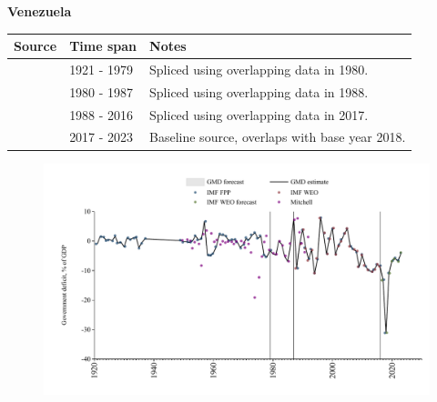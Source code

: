 \documentclass[12pt,a4paper,landscape]{article}
\begin{document}
\begin{adjustbox}{max totalsize={\paperwidth}{\paperheight},center}
\begin{minipage}[t][\textheight][t]{\textwidth}
\vspace*{0.5cm}
{}
\begin{center}
{\Large\bfseries Venezuela}
\end{center}
\vspace{0.5cm}
\begin{table}[H]
\centering
\small
\begin{tabular}{|l|l|l|}
\hline
\textbf{Source} & \textbf{Time span} & \textbf{Notes} \\
\hline
\rowcolor{white}\cite{IMF_FPP}& 1921 - 1979 &Spliced using overlapping data in 1980.\\
\rowcolor{lightgray}\cite{Mitchell}& 1980 - 1987 &Spliced using overlapping data in 1988.\\
\rowcolor{white}\cite{IMF_WEO}& 1988 - 2016 &Spliced using overlapping data in 2017.\\
\rowcolor{lightgray}\cite{IMF_FPP}& 2017 - 2023 &Baseline source, overlaps with base year 2018.\\
\hline
\end{tabular}
\end{table}
\begin{figure}[H]
\centering
\includegraphics[width=\textwidth,height=0.6\textheight,keepaspectratio]{graphs/VEN_govdef_GDP.pdf}
\end{figure}
\end{minipage}
\end{adjustbox}
\end{document}
